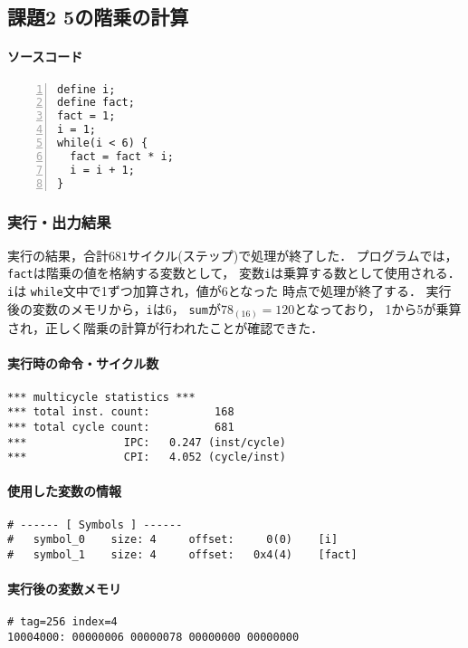 \subsection{課題2 5の階乗の計算}
\paragraph*{ソースコード}

\begin{Verbatim}[numbers=left, xleftmargin=10mm, numbersep=6pt, frame=single,
  fontsize=\small, baselinestretch=0.8]
define i;
define fact;
fact = 1;
i = 1;
while(i < 6) {
  fact = fact * i;
  i = i + 1;
}
\end{Verbatim}

\subsubsection{実行・出力結果}
実行の結果，合計$681$サイクル(ステップ)で処理が終了した．
プログラムでは，\verb|fact|は階乗の値を格納する変数として，
変数\verb|i|は乗算する数として使用される．\verb|i|は
\verb|while|文中で1ずつ加算され，値が$6$となった
時点で処理が終了する．
実行後の変数のメモリから，\verb|i|は$6$，
\verb|sum|が$78_{(16)} = 120$となっており，
1から5が乗算され，正しく階乗の計算が行われたことが確認できた．

\paragraph*{実行時の命令・サイクル数}
\begin{Verbatim}[numbers=none, frame=single,
fontsize=\small, baselinestretch=0.8]
*** multicycle statistics ***
*** total inst. count:          168
*** total cycle count:          681
***               IPC:   0.247 (inst/cycle)
***               CPI:   4.052 (cycle/inst)
\end{Verbatim}

\paragraph*{使用した変数の情報}
\begin{Verbatim}[numbers=none, frame=single,
  fontsize=\small, baselinestretch=0.8]
# ------ [ Symbols ] ------
# 	symbol_0 	size: 4 	offset:     0(0) 	[i]
# 	symbol_1 	size: 4 	offset:   0x4(4) 	[fact]  
\end{Verbatim}

\paragraph*{実行後の変数メモリ}
\begin{Verbatim}[numbers=none, frame=single,
  fontsize=\small, baselinestretch=0.8]
# tag=256 index=4
10004000: 00000006 00000078 00000000 00000000
\end{Verbatim}

